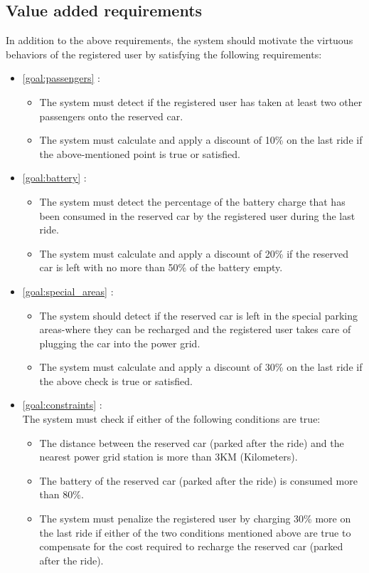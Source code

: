 \subsection{Value added requirements}
In addition to the above requirements, the system should motivate the virtuous behaviors of the registered user by satisfying the following requirements:

\begin{itemize}
	\item \ref{goal:passengers} :
	\begin{itemize}
		\item The system must detect if the registered user has taken at least two other passengers onto the reserved car. 
		\item The system must calculate and apply a discount of 10\% on the last ride if the above-mentioned point is true or satisfied.
	\end{itemize}

	\item \ref{goal:battery} :
	\begin{itemize}
		\item The system must detect the percentage of the battery charge that has been consumed in the reserved car by the registered user during the last ride.
		\item The system must calculate and apply a discount of 20\% if the reserved car is left with no more than 50\% of the battery empty.
	\end{itemize}

	\item \ref{goal:special_areas} :
	\begin{itemize}
		\item The system should detect if the reserved car is left in the special parking areas-where they can be recharged and the registered user takes care of plugging the car into the power grid.
		\item The system must calculate and apply a discount of 30\% on the last ride if the above check is true or satisfied.
	\end{itemize}

	\item \ref{goal:constraints} : \\ The system must check if either of the following conditions are true:
	\begin{itemize}
		\item The distance between the reserved car (parked after the ride) and the nearest power grid station is more than 3KM (Kilometers).
		\item The battery of the reserved car (parked after the ride) is consumed more than 80\%.
		\item The system must penalize the registered user by charging 30\% more on the last ride if either of the two conditions mentioned above are true to compensate for the cost required to recharge the reserved car (parked after the ride).
	\end{itemize}
\end{itemize}

